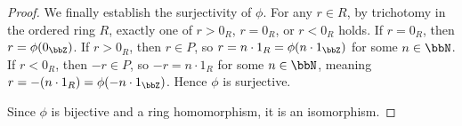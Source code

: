 \begin{proof}
    We finally establish the surjectivity of $\phi$. For any $r \in R$, by trichotomy in the ordered ring $R$, exactly one of $r > 0_R$, $r = 0_R$, or $r < 0_R$ holds. If $r = 0_R$, then $r = \phi(0_\bbZ)$. If $r > 0_R$, then $r \in P$, so $r = n \cdot 1_R = \phi(n \cdot 1_\bbZ)$ for some $n \in \bbN$. If $r < 0_R$, then $-r \in P$, so $-r = n \cdot 1_R$ for some $n \in \bbN$, meaning $r = -(n \cdot 1_R) = \phi(-n \cdot 1_\bbZ)$. Hence $\phi$ is surjective.

    Since $\phi$ is bijective and a ring homomorphism, it is an isomorphism.
\end{proof}